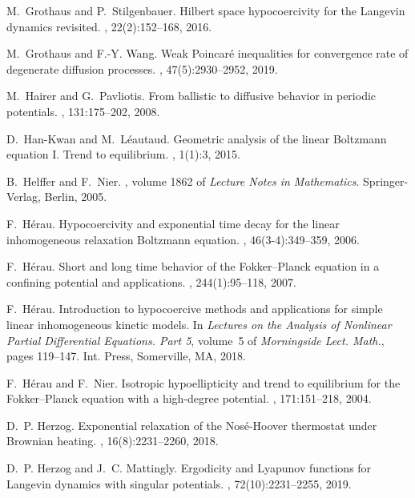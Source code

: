 \documentclass{article}
\begin{document}
\begin{thebibliography}{10}
M.~Grothaus and P.~Stilgenbauer.
\newblock Hilbert space hypocoercivity for the {L}angevin dynamics revisited.
, 22(2):152--168, 2016.

M.~Grothaus and F.-Y. Wang.
\newblock Weak {P}oincar\'{e} inequalities for convergence rate of degenerate
  diffusion processes.
, 47(5):2930--2952, 2019.

M.~Hairer and G.~Pavliotis.
\newblock From ballistic to diffusive behavior in periodic potentials.
, 131:175--202, 2008.

D.~Han-Kwan and M.~L\'{e}autaud.
\newblock Geometric analysis of the linear {B}oltzmann equation {I}. {T}rend to
  equilibrium.
, 1(1):3, 2015.

B.~Helffer and F.~Nier.
, volume 1862 of {\em Lecture Notes in
  Mathematics}.
\newblock Springer-Verlag, Berlin, 2005.

F.~H\'{e}rau.
\newblock Hypocoercivity and exponential time decay for the linear
  inhomogeneous relaxation {B}oltzmann equation.
, 46(3-4):349--359, 2006.

F.~H\'erau.
\newblock Short and long time behavior of the {F}okker–{P}lanck equation in a
  confining potential and applications.
, 244(1):95--118, 2007.

F.~H\'{e}rau.
\newblock Introduction to hypocoercive methods and applications for simple
  linear inhomogeneous kinetic models.
\newblock In {\em Lectures on the Analysis of Nonlinear Partial Differential
  Equations. {P}art 5}, volume~5 of {\em Morningside Lect. Math.}, pages
  119--147. Int. Press, Somerville, MA, 2018.

F.~H\'erau and F.~Nier.
\newblock Isotropic hypoellipticity and trend to equilibrium for the
  {F}okker--{P}lanck equation with a high-degree potential.
, 171:151--218, 2004.

D.~P. Herzog.
\newblock Exponential relaxation of the {N}os\'{e}-{H}oover thermostat under
  {B}rownian heating.
, 16(8):2231--2260, 2018.

D.~P. Herzog and J.~C. Mattingly.
\newblock Ergodicity and {L}yapunov functions for {L}angevin dynamics with
  singular potentials.
, 72(10):2231--2255, 2019.


\end{thebibliography}
\end{document}
